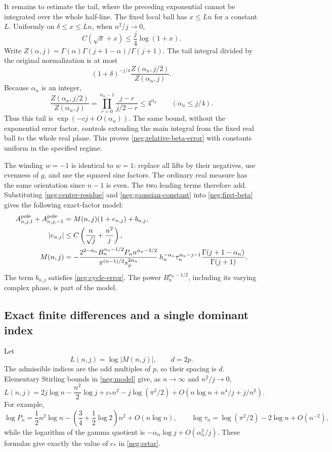 \documentclass[11pt]{article}
\numberwithin{equation}{section}
\theoremstyle{definition}
\begin{document}
It remains to estimate the tail, where the preceding exponential
cannot be integrated over the whole half-line.  The fixed local
ball has \(x\le Ln\) for a constant \(L\).
Uniformly on \(\delta\le x\le Ln\), when \(n^2/j\to0\),
\[
 C(\sqrt x+x)\le\frac j4\log(1+x).
 \]
Write
\(Z(\alpha,j)=\Gamma(\alpha)\Gamma(j+1-\alpha)/\Gamma(j+1)\).
The tail integral divided by the original normalization is
at most
\[
 (1+\delta)^{-j/4}
       \frac{Z(\alpha_n,j/2)}{Z(\alpha_n,j)}.
 \]
Because \(\alpha_n\) is an integer,
\[
 \frac{Z(\alpha_n,j/2)}{Z(\alpha_n,j)}
 =\prod_{r=0}^{\alpha_n-1}
        \frac{j-r}{j/2-r}\le4^{\alpha_n}
                  \qquad(\alpha_n\le j/4).
 \]
Thus this tail is \(\exp(-cj+O(\alpha_n))\).
The same bound, without the exponential error factor,
controls extending the main integral from the fixed real
ball to the whole real plane.  This proves
\eqref{neg:relative-beta-error} with constants uniform in
the specified regime.

The winding \(w=-1\) is identical to \(w=1\): replace all
lifts by their negatives, use evenness of \(g\), and use the
squared sine factors.  The ordinary real measure has the same
orientation since \(n-1\) is even.  The two leading terms
therefore add.  Substituting \eqref{neg:center-residue} and
\eqref{neg:gaussian-constant} into \eqref{neg:first-beta}
gives the following exact-factor model:
\begin{align}
 A^{\rm pole}_{n,j,1}+A^{\rm pole}_{n,j,-1}
 &=M(n,j)(1+e_{n,j})+b_{n,j},
 \label{neg:local-model}\\
 |e_{n,j}|&\le C\left(\frac n{\sqrt j}+\frac{n^2}{j}\right),
 \label{neg:local-error}\\
 M(n,j)&=
 -\frac{2^{2-\alpha_n}B_n^{\alpha_n-1/2}P_n
                         n^{\alpha_n-3/2}}
        {\pi^{(n-1)/2}s_\phi^{2\alpha_n}}\,
 h_n^{-\alpha_n}\tau_n^{\alpha_n-j-1}
       \frac{\Gamma(j+1-\alpha_n)}{\Gamma(j+1)} .
 \label{neg:model}
\end{align}
The term \(b_{n,j}\) satisfies \eqref{neg:cycle-error}.
The power \(B_n^{\alpha_n-1/2}\), including its varying
complex phase, is part of the model.

\subsection{Exact finite differences and a single dominant index}
\label{neg:dominance}

Let
\[
 L(n,j)=\log|M(n,j)|,\qquad d=2p .
 \]
The admissible indices are the odd multiples of \(p\), so their
spacing is \(d\).  Elementary Stirling bounds in
\eqref{neg:model} give, as \(n\to\infty\) and \(n^2/j\to0\),
\begin{equation}
 L(n,j)=2j\log n-\frac{n^2}{2}\log j+c_*n^2
         -j\log(\pi^2/2)
         +O(n\log n+n^4/j+j/n^2).
 \label{neg:L-asymptotic}
\end{equation}
For example,
\[
 \log P_n=\frac12n^2\log n
             -\left(\frac34+\frac12\log2\right)n^2
             +O(n\log n),
 \qquad
 \log\tau_n=\log(\pi^2/2)-2\log n+O(n^{-2}),
 \]
while the logarithm of the gamma quotient is
\(-\alpha_n\log j+O(\alpha_n^2/j)\).
These formulas give exactly the value of \(c_*\) in
\eqref{neg:cstar}.
\end{document}
